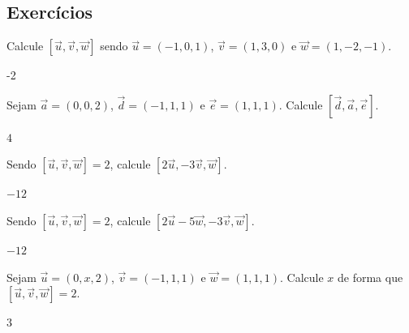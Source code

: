 \subsection*{Exercícios}

\begin{exer}
  Calcule $[\vec{u},\vec{v},\vec{w}]$ sendo $\vec{u}=(-1,0,1)$, $\vec{v}=(1,3,0)$ e $\vec{w}=(1,-2,-1)$.
\end{exer}
\begin{resp}
  -2
\end{resp}

\begin{exer}
  Sejam $\vec{a}=(0,0,2)$, $\vec{d}=(-1,1,1)$ e $\vec{e}=(1,1,1)$. Calcule $[\vec{d},\vec{a},\vec{e}]$.
\end{exer}
\begin{resp}
  $4$
\end{resp}

\begin{exer}
  Sendo $[\vec{u},\vec{v},\vec{w}]=2$, calcule $[2\vec{u},-3\vec{v},\vec{w}]$.
\end{exer}
\begin{resp}
  $-12$
\end{resp}

\begin{exer}
  Sendo $[\vec{u},\vec{v},\vec{w}]=2$, calcule $[2\vec{u}-5\vec{w},-3\vec{v},\vec{w}]$.
\end{exer}
\begin{resp}
  $-12$
\end{resp}

\begin{exer}
  Sejam $\vec{u}=(0,x,2)$, $\vec{v}=(-1,1,1)$ e $\vec{w}=(1,1,1)$. Calcule $x$ de forma que $[\vec{u},\vec{v},\vec{w}]=2$.
\end{exer}
\begin{resp}
  $3$
\end{resp}
